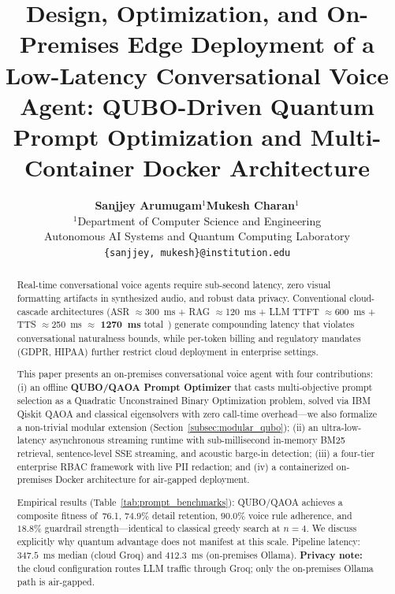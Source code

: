\documentclass[11pt,a4paper]{article}
\begin{document}
\title{\textbf{Design, Optimization, and On-Premises Edge Deployment of a Low-Latency Conversational Voice Agent: QUBO-Driven Quantum Prompt Optimization and Multi-Container Docker Architecture}}

\author{
    \textbf{Sanjjey Arumugam}$^{1}$\quad \textbf{Mukesh Charan}$^{1}$ \\[4pt]
    $^{1}$Department of Computer Science and Engineering \\
    Autonomous AI Systems and Quantum Computing Laboratory \\[2pt]
    \texttt{\{sanjjey, mukesh\}@institution.edu}
}

\date{}
\maketitle
\thispagestyle{fancy}

\begin{abstract}
\noindent
Real-time conversational voice agents require sub-second latency, zero visual formatting artifacts in synthesized audio, and robust data privacy. Conventional cloud-cascade architectures (ASR $\approx$300~ms + RAG $\approx$120~ms + LLM TTFT $\approx$600~ms + TTS $\approx$250~ms $\approx$ \textbf{1270~ms} total~\cite{larson2020turn}) generate compounding latency that violates conversational naturalness bounds, while per-token billing and regulatory mandates (GDPR, HIPAA) further restrict cloud deployment in enterprise settings.

This paper presents an on-premises conversational voice agent with four contributions: (i) an offline \textbf{QUBO/QAOA Prompt Optimizer} that casts multi-objective prompt selection as a Quadratic Unconstrained Binary Optimization problem, solved via IBM Qiskit QAOA and classical eigensolvers with zero call-time overhead---we also formalize a non-trivial modular extension (Section~\ref{subsec:modular_qubo}); (ii) an ultra-low-latency asynchronous streaming runtime with sub-millisecond in-memory BM25 retrieval, sentence-level SSE streaming, and acoustic barge-in detection; (iii) a four-tier enterprise RBAC framework with live PII redaction; and (iv) a containerized on-premises Docker architecture for air-gapped deployment.

Empirical results (Table~\ref{tab:prompt_benchmarks}): QUBO/QAOA achieves a composite fitness of~76.1, $74.9\%$ detail retention, $90.0\%$ voice rule adherence, and $18.8\%$ guardrail strength---identical to classical greedy search at $n{=}4$. We discuss explicitly why quantum advantage does not manifest at this scale. Pipeline latency: $347.5$~ms median (cloud Groq) and $412.3$~ms (on-premises Ollama). \textbf{Privacy note:} the cloud configuration routes LLM traffic through Groq; only the on-premises Ollama path is air-gapped.
\end{abstract}
\end{document}

